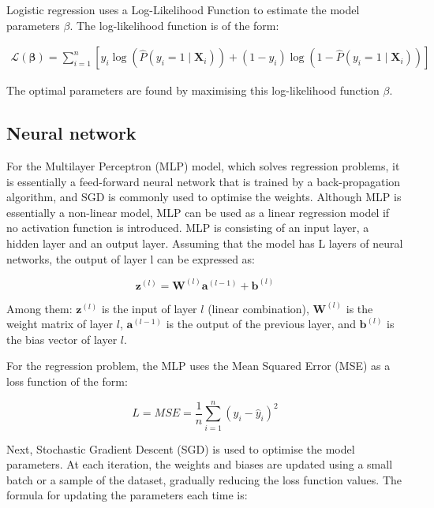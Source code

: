 \documentclass[conference]{IEEEtran}
\begin{document}
Logistic regression uses a Log-Likelihood Function to estimate the model parameters
\( \beta \). The log-likelihood function is of the form:

{\small
\begin{align}
    \mathcal{L}(\boldsymbol{\beta}) = \sum_{i=1}^{n} \left[ y_i \log\left( \hat{P}(y_i = 1 \mid \mathbf{X}_i) \right) + (1 - y_i) \log\left( 1 - \hat{P}(y_i = 1 \mid \mathbf{X}_i) \right) \right]
\end{align}
}

The optimal parameters are found by maximising this log-likelihood function \( \beta \).

\subsection{Neural network}

For the Multilayer Perceptron (MLP) model, which solves regression problems, it is essentially a feed-forward neural network that is trained by a back-propagation algorithm, and SGD is commonly used to optimise the weights. Although MLP is essentially a non-linear model, MLP can be used as a linear regression model if no activation function is introduced.
MLP is consisting of an input layer, a hidden layer and an output layer. Assuming that the model has L layers of neural networks, the output of layer l can be expressed as:

\begin{equation}
    \mathbf{z}^{(l)} = \mathbf{W}^{(l)} \mathbf{a}^{(l-1)} + \mathbf{b}^{(l)}
\end{equation}

Among them: $\mathbf{z}^{(l)}$ is the input of layer $l$ (linear combination), $\mathbf{W}^{(l)}$ is the weight matrix of layer $l$, $\mathbf{a}^{(l-1)}$ is the output of the previous layer, and $\mathbf{b}^{(l)}$ is the bias vector of layer $l$.

For the regression problem, the MLP uses the Mean Squared Error (MSE) as a loss function of the form:

\begin{equation}
    L = MSE = \frac{1}{n} \sum_{i=1}^{n} (y_i - \hat{y}_i)^2
\end{equation}

Next, Stochastic Gradient Descent (SGD) is used to optimise the model parameters. At each iteration, the weights and biases are updated using a small batch or a sample of the dataset, gradually reducing the loss function values. The formula for updating the parameters each time is:
\end{document}
